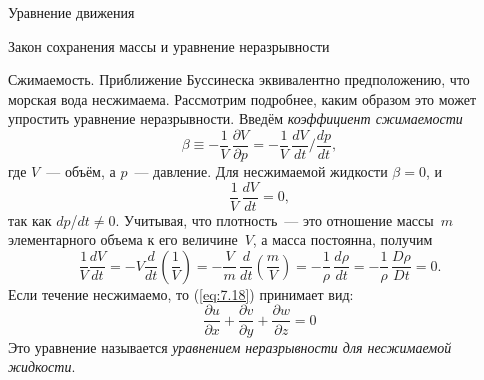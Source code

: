 \begin{chapter}{Уравнение движения}
\begin{section}{Закон сохранения массы и уравнение неразрывности}
\begin{paragraph}{Сжимаемость.}
Приближение Буссинеска эквивалентно предположению, что морская вода
несжимаема. Рассмотрим подробнее, каким образом это может упростить
уравнение неразрывности. Введём \emph{коэффициент сжимаемости}
\begin{displaymath}
\beta \equiv -\frac{1}{V}\,\frac{\partial{V}}{\partial{p}} 
 = -\frac{1}{V}\,\frac{dV}{dt}\Big/\frac{dp}{dt},
\end{displaymath}
где $V$~--- объём, а $p$~--- давление. Для несжимаемой жидкости
$\beta = 0$, и
\begin{displaymath}
\frac{1}{V}\,\frac{dV}{dt} = 0,
\end{displaymath}
так как $dp$/$dt \not= 0$. Учитывая, что плотность~--- это отношение массы~$m$
элементарного объема к его величине~$V$, а масса постоянна, получим
\begin{displaymath}
\frac{1}{V}\frac{dV}{dt} 
 = -V\frac{d}{dt}\left(\frac{1}{V}\right) 
 = -\frac{V}{m}\,\frac{d}{dt}\left(\frac{m}{V}\right)
 = -\frac{1}{\rho}\,\frac{d\rho}{dt} 
 = -\frac{1}{\rho}\, \frac{D\rho}{Dt} = 0.
\end{displaymath}
Если течение несжимаемо, то (\ref{eq:7.18}) принимает вид:
\begin{equation}\label{eq:7.19}
\boxed{
 \frac{\partial{u}}{\partial{x}} + \frac{\partial{v}}{\partial{y}} + \frac{\partial{w}}{\partial{z}} = 0
}
\end{equation}
Это уравнение называется \emph{уравнением неразрывности для несжимаемой 
жидкости}.
%

\end{paragraph}
\end{section}
\end{chapter}
